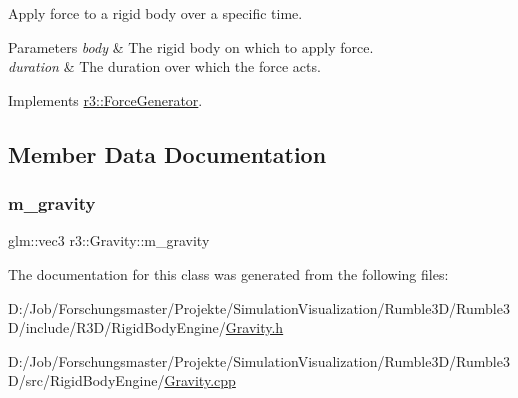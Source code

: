 Apply force to a rigid body over a specific time. 


\begin{DoxyParams}{Parameters}
{\em body} & The rigid body on which to apply force. \\
\hline
{\em duration} & The duration over which the force acts. \\
\hline
\end{DoxyParams}


Implements \mbox{\hyperlink{classr3_1_1_force_generator_a69bebbde8cef792d6636af50037af2aa}{r3\+::\+Force\+Generator}}.



\subsection{Member Data Documentation}
\mbox{\label{classr3_1_1_gravity_a2feb1d84fc4118e6e30b707a7224f6ef}} 
\subsubsection{\texorpdfstring{m\+\_\+gravity}{m\_gravity}}
{\footnotesize\ttfamily glm\+::vec3 r3\+::\+Gravity\+::m\+\_\+gravity\hspace{0.3cm}{\ttfamily [protected]}}



The documentation for this class was generated from the following files\+:\begin{DoxyCompactItemize}
\item 
D\+:/\+Job/\+Forschungsmaster/\+Projekte/\+Simulation\+Visualization/\+Rumble3\+D/\+Rumble3\+D/include/\+R3\+D/\+Rigid\+Body\+Engine/\mbox{\hyperlink{_gravity_8h}{Gravity.\+h}}\item 
D\+:/\+Job/\+Forschungsmaster/\+Projekte/\+Simulation\+Visualization/\+Rumble3\+D/\+Rumble3\+D/src/\+Rigid\+Body\+Engine/\mbox{\hyperlink{_gravity_8cpp}{Gravity.\+cpp}}\end{DoxyCompactItemize}
